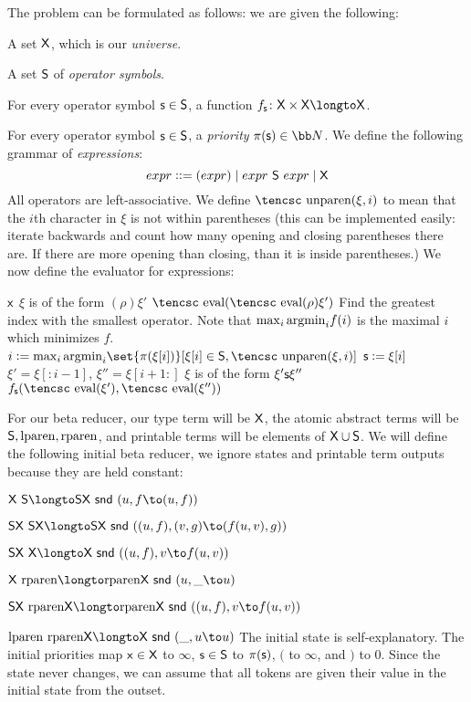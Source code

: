 The problem can be formulated as follows: we are given the following:
\benum
    \item A set ${\sf X}$, which is our {\it universe}.
    \item A set ${\sf S}$ of {\it operator symbols}.
    \item For every operator symbol ${\sf s}\in{\sf S}$, a function $f_{\s s}\colon\s X\times\s X\longto\s X$.
    \item For every operator symbol ${\sf s}\in{\sf S}$, a {\it priority} $\pi(\s s)\in{\bb N}$.
\eenum
We define the following grammar of {\it expressions}:
$$ {\sl expr} \mathrel{{\mathop:}{\mathop:}{=}} ({\sl expr}) \mid {\sl expr}\ {\sf S}\ {\sl expr} \mid {\sf X} $$
\def\unparen{\hbox{\tencsc unparen}}%
All operators are left-associative.
We define $\unparen(\xi,i)$ to mean that the $i$th character in $\xi$ is not within parentheses (this can be implemented easily: iterate backwards and count how many opening and closing parentheses there
are.
If there are more opening than closing, than it is inside parentheses.)
We now define the evaluator for expressions:

\def\eval{\hbox{\tencsc eval}}
\algorithm
{}
        \State\Return ${\sf x}$
        \State $\xi$ is of the form $(\rho)\xi'$
        \State\Return $\eval(\eval(\rho)\xi')$
    \Else
        \Comment Find the greatest index with the smallest operator.\cr
        Note that $\max_i{\rm argmin}_if(i)$ is the maximal $i$ which minimizes $f$.\EndComment
        \State $i\coloneqq\max_i{\rm argmin}_i\set{\pi(\xi[i])}[{\xi[i]\in\s S,\unparen(\xi,i)}]$
        \State ${\sf s}\mathrel{{\mathop:}{=}}\xi[i]$
        \Comment $\xi'=\xi[:i-1]$, $\xi''=\xi[i+1:]$ \EndComment
        \State $\xi$ is of the form $\xi'{\sf s}\xi''$
        \State\Return $f_{\s s}(\eval(\xi'),\eval(\xi''))$
    \EndIf
\EndFunc
\ealgorithm

For our beta reducer, our type term will be ${\sf X}$, the atomic abstract terms will be ${\sf S},{\rm lparen},{\rm rparen}$, and printable terms will be elements of ${\sf X}\cup{\sf S}$.
We will define the following initial beta reducer, we ignore states and printable term outputs because they are held constant:
\blist
    \item $\s X\ \s S\longto\s S\s X\ \snd\ (u,f\to(u,f))$
    \item $\s S\s X\ \s S\s X \longto\s S\s X\ \snd\ ((u,f),(v,g)\to(f(u,v),g))$
    \item $\s S\s X\ \s X\longto\s X\ \snd\ ((u,f),v\to f(u,v))$
    \item $\s X\ \Rparen \longto \Rparen\s X\ \snd\ (u,\_\to u)$
    \item $\s S\s X\ \Rparen\s X \longto\Rparen\s X\ \snd\ ((u,f),v\to f(u,v))$
    \item $\Lparen\ \Rparen\s X \longto\s X\ \snd\ (\_,u\to u)$
\elist
\noindent The initial state is self-explanatory.
The initial priorities map ${\sf x}\in{\sf X}$ to $\infty$, ${\sf s}\in{\sf S}$ to $\pi({\sf s})$, $($ to $\infty$, and $)$ to $0$.
Since the state never changes, we can assume that all tokens are given their value in the initial state from the outset.

